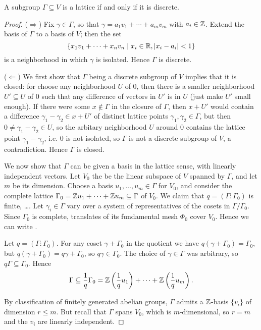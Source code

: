 \begin{proposition}
	A subgroup $\Gamma\subseteq V$ is a lattice if and only if it is discrete.
\end{proposition}
\begin{proof}
	($\Longrightarrow$) Fix $\gamma\in\Gamma$, so that $\gamma=a_1v_1+\cdots+a_mv_m$ with $a_i\in\mathbb{Z}$. Extend the basis of $\Gamma$ to a basis of $V$; then the set
	\[
		\{x_1v_1 + \cdots + x_nv_n \mid x_i\in\mathbb{R}, |x_i-a_i|<1\}
	\]
	is a neighborhood in which $\gamma$ is isolated. Hence $\Gamma$ is discrete.

	($\Longleftarrow$) We first show that $\Gamma$ being a discrete subgroup of $V$ implies that it is closed: for choose any neighborhood $U$ of 0, then there is a smaller neighborhood $U'\subseteq U$ of 0 such that any difference of vectors in $U'$ is in $U$ (just make $U'$ small enough). If there were some $x\notin\Gamma$ in the closure of $\Gamma$, then $x+U'$ would contain a difference $\gamma_1-\gamma_2\in x+U'$ of distinct lattice points $\gamma_1,\gamma_2\in\Gamma$, but then $0\neq \gamma_1-\gamma_2\in U$, so the arbitary neighborhood $U$ around 0 contains the lattice point $\gamma_1-\gamma_2$, i.e. 0 is not isolated, so $\Gamma$ is not a discrete subgroup of $V$, a contradiction. Hence $\Gamma$ is closed.

	We now show that $\Gamma$ can be given a basis in the lattice sense, with linearly independent vectors. Let $V_0$ the be the linear subspace of $V$ spanned by $\Gamma$, and let $m$ be its dimension. Choose a basis $u_1,\dots,u_m\in\Gamma$ for $V_0$, and consider the complete lattice $\Gamma_0 = \mathbb{Z} u_1 + \cdots + \mathbb{Z} u_m \subseteq\Gamma$ of $V_0$. We claim that $q=(\Gamma:\Gamma_0)$ is finite, \dots. Let $\gamma_i\in\Gamma$ vary over a system of representatives of the cosets in $\Gamma/\Gamma_0$. Since $\Gamma_0$ is complete, translates of its fundamental mesh $\Phi_0$ cover $V_0$. Hence we can write .

	Let $q=(\Gamma:\Gamma_0)$. For any coset $\gamma+\Gamma_0$ in the quotient we have $q(\gamma+\Gamma_0)=\Gamma_0$, but $q(\gamma+\Gamma_0)=q\gamma+\Gamma_0$, so $q\gamma\in\Gamma_0$. The choice of $\gamma\in\Gamma$ was arbitrary, so $q\Gamma\subseteq\Gamma_0$. Hence
	\[
		\Gamma\subseteq\frac{1}{q}\Gamma_0 = \mathbb{Z}\left(\frac{1}{q}u_1\right) + \cdots + \mathbb{Z}\left(\frac{1}{q}u_m\right).
	\]

	By classification of finitely generated abelian groups, $\Gamma$ admits a $\mathbb{Z}$-basis $\{v_i\}$ of dimension $r\leq m$. But recall that $\Gamma$ spans $V_0$, which is $m$-dimensional, so $r=m$ and the $v_i$ are linearly independent.
\end{proof}


